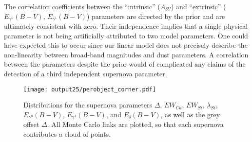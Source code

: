 \documentclass{aastex61}   	%
\begin{document}
The correlation coefficients between the ``intrinsic''  ($A_{\delta U}$) and ``extrinsic''
($E_{\gamma^0}(B-V)$, $E_{\gamma^1}(B-V)$)  parameters are
directed by the prior and are ultimately consistent with zero.
Their independence implies that a single physical parameter is not being artificially attributed to two
model parameters.  One could have expected this to occur since our linear model does not precisely
describe the non-linearity between broad-band magnitudes and dust parameters. A
correlation 
between the parameters despite the prior would of complicated any claims of the detection of a third independent supernova parameter.

\begin{figure}[htbp] %
   \centering
   \texttt{[image: output25/perobject\_corner.pdf]} 
   \caption{
   Distributions for the supernova parameters $\Delta$, $EW_{Ca}$, $EW_{Si}$, $\lambda_{Si}$, $E_{\gamma^0}(B-V)$,  $E_{\gamma^1}(B-V)$,  and $E_{\delta}(B-V)$, as well as the grey offset
$\Delta$.  All Monte Carlo links are plotted, so that each supernova contributes a cloud of points.
   \label{perobject2:fig}}
\end{figure}
\end{document}
